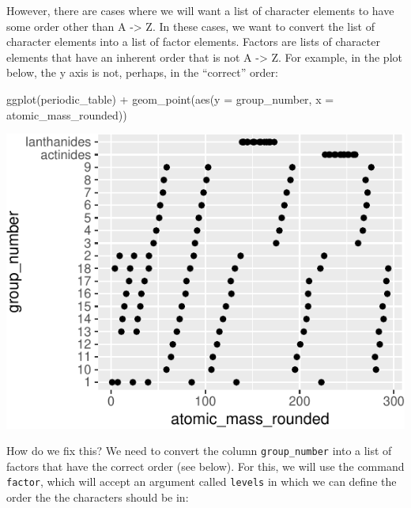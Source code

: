 \documentclass[
]{krantz}
\newenvironment{Shaded}{\begin{snugshade}}{\end{snugshade}}
\newcommand{\AttributeTok}[1]{\textcolor[rgb]{0.77,0.63,0.00}{#1}}
\newcommand{\FunctionTok}[1]{\textcolor[rgb]{0.00,0.00,0.00}{#1}}
\newcommand{\NormalTok}[1]{#1}
\newcommand{\SpecialCharTok}[1]{\textcolor[rgb]{0.00,0.00,0.00}{#1}}
\begin{document}
However, there are cases where we will want a list of character elements to have some order other than A -\textgreater{} Z. In these cases, we want to convert the list of character elements into a list of factor elements. Factors are lists of character elements that have an inherent order that is not A -\textgreater{} Z. For example, in the plot below, the y axis is not, perhaps, in the ``correct'' order:

\begin{Shaded}
\begin{Highlighting}[]
\FunctionTok{ggplot}\NormalTok{(periodic\_table) }\SpecialCharTok{+}
  \FunctionTok{geom\_point}\NormalTok{(}\FunctionTok{aes}\NormalTok{(}\AttributeTok{y =}\NormalTok{ group\_number, }\AttributeTok{x =}\NormalTok{ atomic\_mass\_rounded))}
\end{Highlighting}
\end{Shaded}

\begin{center}\includegraphics{index_files/figure-latex/unnamed-chunk-187-1} \end{center}

How do we fix this? We need to convert the column \texttt{group\_number} into a list of factors that have the correct order (see below). For this, we will use the command \texttt{factor}, which will accept an argument called \texttt{levels} in which we can define the order the the characters should be in:
\end{document}
